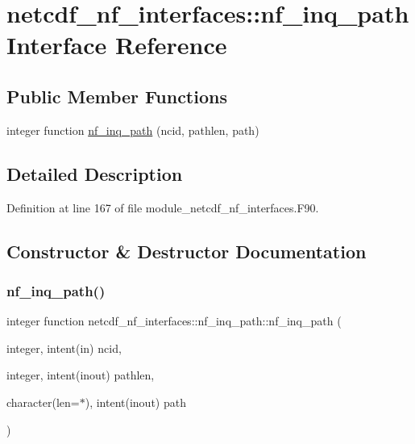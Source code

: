 \hypertarget{interfacenetcdf__nf__interfaces_1_1nf__inq__path}{}\section{netcdf\+\_\+nf\+\_\+interfaces\+:\+:nf\+\_\+inq\+\_\+path Interface Reference}
\label{interfacenetcdf__nf__interfaces_1_1nf__inq__path}
\subsection*{Public Member Functions}
\begin{DoxyCompactItemize}
\item 
integer function \hyperlink{interfacenetcdf__nf__interfaces_1_1nf__inq__path_a529845a46374d9eedabee6ae74d4389a}{nf\+\_\+inq\+\_\+path} (ncid, pathlen, path)
\end{DoxyCompactItemize}


\subsection{Detailed Description}


Definition at line 167 of file module\+\_\+netcdf\+\_\+nf\+\_\+interfaces.\+F90.



\subsection{Constructor \& Destructor Documentation}
\mbox{\label{interfacenetcdf__nf__interfaces_1_1nf__inq__path_a529845a46374d9eedabee6ae74d4389a}} 
\subsubsection{\texorpdfstring{nf\+\_\+inq\+\_\+path()}{nf\_inq\_path()}}
{\footnotesize\ttfamily integer function netcdf\+\_\+nf\+\_\+interfaces\+::nf\+\_\+inq\+\_\+path\+::nf\+\_\+inq\+\_\+path (\begin{DoxyParamCaption}\item[{integer, intent(in)}]{ncid,  }\item[{integer, intent(inout)}]{pathlen,  }\item[{character(len=$\ast$), intent(inout)}]{path }\end{DoxyParamCaption})}



